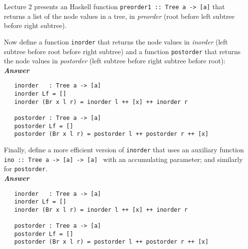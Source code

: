 \documentclass[a4paper]{article}
\begin{document}
\begin{exercise}\label{exer-tree-traversal}
  Lecture 2 presents an Haskell function \texttt{preorder1 ::\ Tree a ->
    [a]} that returns a list of the node values in a tree, in
  \emph{preorder} (root before left subtree before right subtree).
  
  Now define a function \texttt{inorder} that returns the node values
  in \emph{inorder} (left subtree before root before right subtree)
  and a function \texttt{postorder} that returns the node values in
  \emph{postorder} (left subtree before right subtree before root):\\
  
\noindent
\textbf{\emph{Answer}}
{\codesetup\begin{verbatim}
   inorder   : Tree a -> [a]
   inorder Lf = []
   inorder (Br x l r) = inorder l ++ [x] ++ inorder r
   
   postorder : Tree a -> [a]
   postorder Lf = []
   postorder (Br x l r) = postorder l ++ postorder r ++ [x]
\end{verbatim}}

\noindent 
Finally, define a more efficient version of \texttt{inorder} that
  uses an auxiliary function \texttt{ino ::\ Tree a -> [a] -> [a]
    } with an accumulating parameter; and similarly for
  \texttt{postorder}.  \\
  
  \noindent
\textbf{\emph{Answer}}
{\codesetup\begin{verbatim}
   inorder   : Tree a -> [a]
   inorder Lf = []
   inorder (Br x l r) = inorder l ++ [x] ++ inorder r
   
   postorder : Tree a -> [a]
   postorder Lf = []
   postorder (Br x l r) = postorder l ++ postorder r ++ [x]
\end{verbatim}}
\end{exercise}
\end{document}
